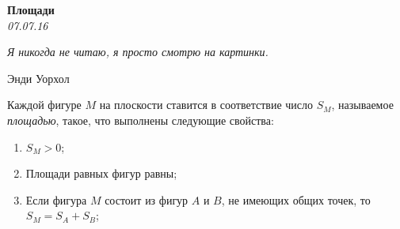 \begin{center}
\textbf{\Large Площади}\\
\textit{07.07.16}

\epigraph{\it Я никогда не читаю, я просто смотрю на картинки.}{Энди Уорхол}

 Каждой фигуре $M$ на плоскости ставится в соответствие число $S_M$, называемое \textit{площадью}, такое, что выполнены следующие свойства:

\begin{enumerate}
	\item $S_M > 0$;
	\item Площади равных фигур равны;
	\item Если фигура $M$ состоит из фигур $A$ и $B$, не имеющих общих точек, то $S_M = S_A + S_B$;
\end{enumerate}

\end{center}

